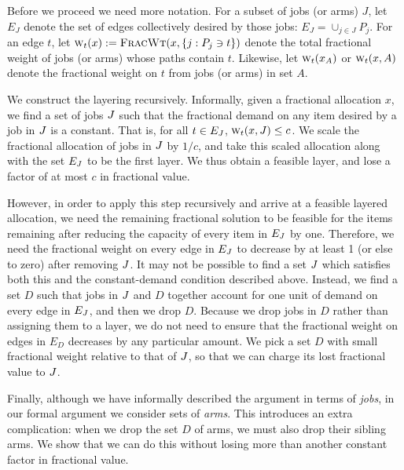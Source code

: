 Before we proceed we need more notation. For a subset of jobs (or
arms) $J$, let $E_J$ denote the set of edges collectively desired by
those jobs: $E_J = \cup_{j\in J} P_j$. For an edge $t$, let
$\textsc{w}_{t}(x) := {\normalfont\textsc{FracWt}}(x,\{j:P_j\ni t\})$ denote the total fractional weight
of jobs (or arms) whose paths contain $t$. Likewise, let $\textsc{w}_{t}(x_A)$
or $\textsc{w}_{t}(x,A)$ denote the fractional weight on $t$ from jobs (or
arms) in set $A$.

We construct the layering recursively. Informally, given a fractional
allocation $x$, we find a set of jobs $J$ such that the fractional demand
on any item desired by a job in $J$ is a constant. That is, for
all $t\in E_J$, $\textsc{w}_{t}(x,J)\le c$. 
We scale the
fractional allocation of jobs in $J$ by $1/c$, and take this scaled
allocation along with the set $E_J$ to be the first layer. We thus obtain a feasible
layer, and lose a factor of at most $c$ in fractional value.

However, in order to apply this step recursively and arrive at a
feasible layered allocation, we need the remaining fractional solution
to be feasible for the items remaining after reducing the capacity of
every item in $E_J$ by one. Therefore, we need the fractional
weight on every edge in $E_J$ to decrease by at least 1 (or else
to zero) after removing $J$.  It may not be possible to find a
set $J$ which satisfies both this and the constant-demand
condition described above. Instead, we find a set $D$ such that jobs
in $J$ and $D$ together account for one unit of demand on every
edge in $E_J$, and then we drop $D$.  Because we drop jobs in
$D$ rather than assigning them to a layer, we do not need to ensure
that the fractional weight on edges in $E_D$ decreases by any
particular amount. We pick a set $D$ with small fractional weight
relative to that of $J$, so that we can charge its lost
fractional value to $J$.

Finally, although we have informally described the argument in terms
of {\em jobs}, in our formal argument we consider sets of {\em
  arms}. This introduces an extra complication: when we drop the set
$D$ of arms, we must also drop their sibling arms. We show that we can
do this without losing more than another constant factor in fractional
value.

